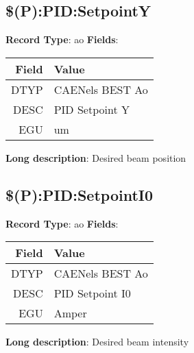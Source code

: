 \subsection{\$(P):PID:SetpointY}
\textbf{Record Type}: ao \newline \newline 
\textbf{Fields}: \newline 
\begin{tabularx}{0.7\linewidth}{|r|X|}
\hline Field & Value \\
\hline
\hline
DTYP & CAENels BEST Ao\\
\hline
DESC & PID Setpoint Y\\
\hline
EGU & um\\
\hline
\end{tabularx}
\newline \newline \newline
\textbf{Long description}: \newline 
 Desired beam position
\newline \newline


\subsection{\$(P):PID:SetpointI0}
\textbf{Record Type}: ao \newline \newline 
\textbf{Fields}: \newline 
\begin{tabularx}{0.7\linewidth}{|r|X|}
\hline Field & Value \\
\hline
\hline
DTYP & CAENels BEST Ao\\
\hline
DESC & PID Setpoint I0\\
\hline
EGU & Amper\\
\hline
\end{tabularx}
\newline \newline \newline
\textbf{Long description}: \newline 
 Desired beam intensity
\newline \newline


